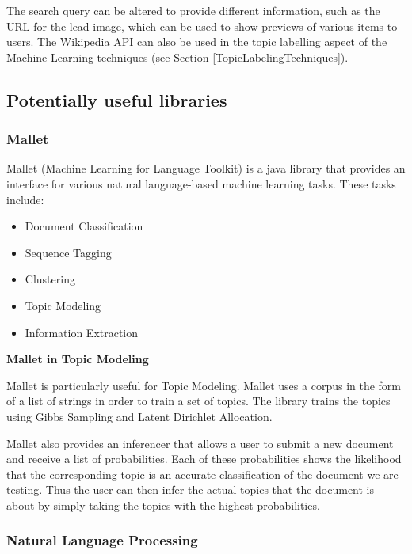 \documentclass[12pt]{article}
\begin{document}
The search query can be altered to provide different information, such as the URL for the lead image, which can be used to show previews of various items to users. The Wikipedia API can also be used in the topic labelling aspect of the Machine Learning techniques (see Section \ref{TopicLabelingTechniques}).

\subsection{Potentially useful libraries}

\subsubsection{Mallet}

\label{mallet}

Mallet (Machine Learning for Language Toolkit) is a java library that provides an interface for various natural language-based machine learning tasks. These tasks include:

\begin{itemize}
	\item Document Classification
	\item Sequence Tagging
	\item Clustering
	\item Topic Modeling
	\item Information Extraction \\
\end{itemize}

\textbf{Mallet in Topic Modeling}

Mallet is particularly useful for Topic Modeling. Mallet uses a corpus in the form of a list of strings in order to train a set of topics. The library trains the topics using Gibbs Sampling and Latent Dirichlet Allocation.

Mallet also provides an inferencer that allows a user to submit a new document and receive a list of probabilities. Each of these probabilities shows the likelihood that the corresponding topic is an accurate classification of the document we are testing. Thus the user can then infer the actual topics that the document is about by simply taking the topics with the highest probabilities. 
 

\subsubsection{Natural Language Processing}
\end{document}
